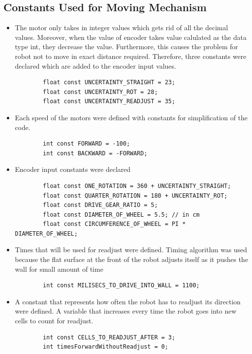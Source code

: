 \documentclass[11pt]{article}
\begin{document}

\subsection{Constants Used for Moving Mechanism}
\begin{itemize}
\item The motor only takes in integer values which gets rid of all the decimal values. Moreover, when the value of encoder takes value calulated as the data type int, they decrease the value. Furthermore, this causes the problem for robot not to move in exact distance required. Therefore, three constants were declared which are added to the encoder input values. 
	\begin{verbatim}
		float const UNCERTAINTY_STRAIGHT = 23;
		float const UNCERTAINTY_ROT = 28;
		float const UNCERTAINTY_READJUST = 35;
	\end{verbatim} 
\item Each speed of the motors were defined with constants for simplification of the code. 
	\begin{verbatim}
		int const FORWARD = -100;
		int const BACKWARD = -FORWARD;
	\end{verbatim} 
\item Encoder input constants were declared
	\begin{verbatim}
		float const ONE_ROTATION = 360 + UNCERTAINTY_STRAIGHT;
		float const QUARTER_ROTATION = 180 + UNCERTAINTY_ROT;
		float const DRIVE_GEAR_RATIO = 5;
		float const DIAMETER_OF_WHEEL = 5.5; // in cm
		float const CIRCUMFERENCE_OF_WHEEL = PI * DIAMETER_OF_WHEEL;
	\end{verbatim} 
\item Times that will be used for readjust were defined. Timing algorithm was used because the flat surface at the front of the robot adjusts itself as it pushes the wall for small amount of time
	\begin{verbatim}
		int const MILISECS_TO_DRIVE_INTO_WALL = 1100;
	\end{verbatim} 
\item A constant that represents how often the robot has to readjust its direction were defined. A variable that increases every time the robot goes into new cells to count for readjust.
	\begin{verbatim}
		int const CELLS_TO_READJUST_AFTER = 3;
		int timesForwardWithoutReadjust = 0;
	\end{verbatim}  
\end{itemize}
\end{document}
